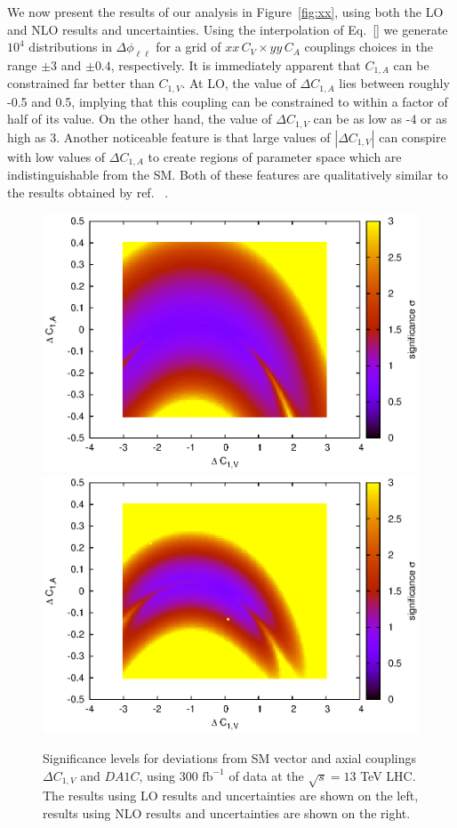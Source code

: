 \documentclass[preprint]{JHEP3} %
\def\invfb {\mathrm{fb}^{-1}}
\def\A1C{C_{1,A}}
\def\V1C{C_{1,V}}
\def\DA1C{\Delta C_{1,A}}
\def\DV1C{\Delta C_{1,V}}
\begin{document}
We now present the results of our analysis in Figure~\ref{fig:xx}, using both the LO and NLO results and uncertainties.
Using the interpolation of Eq.~\ref{} we generate $10^4$ distributions in $\Delta \phi_{\ell\ell}$ for a grid of $xx \, C_V \times yy\, C_A$ couplings choices in the range $\pm 3$ and $\pm 0.4$, respectively. 
It is immediately apparent that $\A1C$ can be constrained far better than $\V1C$. At LO, the value of $\DA1C$ lies between roughly -0.5 and 0.5, implying that this coupling can be constrained to within a factor of half of its value. On the other hand, the value of $\DV1C$ can be as low as -4 or as high as 3. Another noticeable feature is that large values of $| \DV1C |$ can conspire with low values of $\DA1C$ to create regions of parameter space which are indistinguishable from the SM. Both of these features are qualitatively similar to the results obtained by ref. ~\cite{baur}. 
\begin{figure}
\includegraphics[scale=0.6]{BLLLO1223HSsig_SUA2_300_1.30.eps} 
\includegraphics[scale=0.6]{BLLNLO1223sig_SUA2_300_1.15.eps} 
\caption{Significance levels for deviations from SM vector and axial couplings $\DV1C$ and $DA1C$,  using 300 $\invfb$ of data at the $\sqrt{s}=13$ TeV LHC. The results using LO results and uncertainties are shown on the left, results using NLO results and uncertainties are shown on the right.} \label{fig:LHC13sigLO} 
\end{figure}
\end{document}
